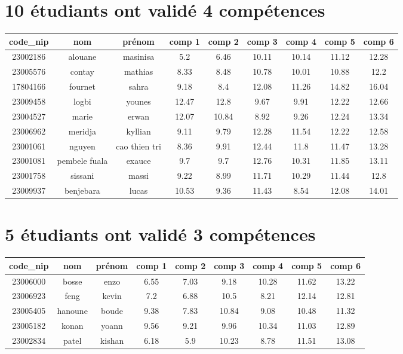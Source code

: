 \documentclass{article}%
\begin{document}
\section{10 étudiants ont validé 4 compétences}%
\label{sec:10tudiantsontvalid4comptences}%
\begin{tabular}{|c|c|c|c|c|c|c|c|c|}%
\hline%
code\_nip&nom&prénom&comp 1&comp 2&comp 3&comp 4&comp 5&comp 6\\%
\hline%
23002186&alouane&masinisa&5.2&6.46&10.11&10.14&11.12&12.28\\%
\hline%
23005576&contay&mathias&8.33&8.48&10.78&10.01&10.88&12.2\\%
\hline%
17804166&fournet&sahra&9.18&8.4&12.08&11.26&14.82&16.04\\%
\hline%
23009458&logbi&younes&12.47&12.8&9.67&9.91&12.22&12.66\\%
\hline%
23004527&marie&erwan&12.07&10.84&8.92&9.26&12.24&13.34\\%
\hline%
23006962&meridja&kyllian&9.11&9.79&12.28&11.54&12.22&12.58\\%
\hline%
23001061&nguyen&cao thien tri&8.36&9.91&12.44&11.8&11.47&13.28\\%
\hline%
23001081&pembele fuala&exauce&9.7&9.7&12.76&10.31&11.85&13.11\\%
\hline%
23001758&sissani&massi&9.22&8.99&11.71&10.29&11.44&12.8\\%
\hline%
23009937&benjebara&lucas&10.53&9.36&11.43&8.54&12.08&14.01\\%
\hline%
\end{tabular}

%
\section{5 étudiants ont validé 3 compétences}%
\label{sec:5tudiantsontvalid3comptences}%
\begin{tabular}{|c|c|c|c|c|c|c|c|c|}%
\hline%
code\_nip&nom&prénom&comp 1&comp 2&comp 3&comp 4&comp 5&comp 6\\%
\hline%
23006000&bosse&enzo&6.55&7.03&9.18&10.28&11.62&13.22\\%
\hline%
23006923&feng&kevin&7.2&6.88&10.5&8.21&12.14&12.81\\%
\hline%
23005405&hanoune&boude&9.38&7.83&10.84&9.08&10.48&11.32\\%
\hline%
23005182&konan&yoann&9.56&9.21&9.96&10.34&11.03&12.89\\%
\hline%
23002834&patel&kishan&6.18&5.9&10.23&8.78&11.51&13.08\\%
\hline%
\end{tabular}
\end{document}

